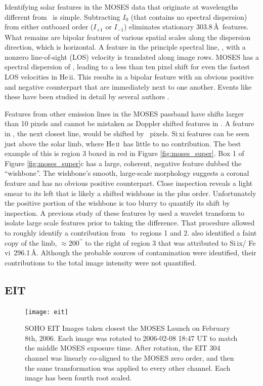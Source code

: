 		
		Identifying solar features in the MOSES data that originate at wavelengths different from \heii\ is simple. 
		Subtracting $I_0$ (that contains no spectral dispersion) from either outboard order ($I_{+1}$ or $I_{-1}$) eliminates stationary 303.8\,\AA\ features. 
		What remains are bipolar features of various spatial scales along the dispersion direction, which is horizontal.  
		A feature in the principle spectral line, \heii, with a nonzero line-of-sight (LOS) velocity is translated along image rows.    
		MOSES has a spectral dispersion of \spectdispersvel, leading to a less than ten pixel shift for even the fastest LOS velocities in He\,{\sc ii}. 
		This results in a bipolar feature with an obvious positive and negative counterpart that are immediately next to one another. Events like these have been studied in detail by several authors \citep{Fox2011,Courrier2018,Rust2019}.
		
		Features from other emission lines in the MOSES passband have shifts larger than 10 pixels and cannot be mistaken as Doppler shifted features in \heii. 
		A feature in \sixi, the next closest line, would be shifted by \sixipix\ pixels. 
		Si\,{\sc xi} features can be seen just above the solar limb, where He\,\textsc{ii}\ has little to no contribution. 
		The best example of this is region 3 boxed in red in Figure \ref{fig:moses_super}.  
		Box 1 of Figure \ref{fig:moses_super}c has a large, coherent, negative feature dubbed the ``wishbone''.  
		The wishbone's smooth, large-scale morphology suggests a coronal feature and has no obvious positive counterpart.  
		Close inspection reveals a light smear to its left that is likely a shifted wishbone in the plus order.  
		Unfortunately the positive portion of the wishbone is too blurry to quantify its shift by inspection. 
		A previous study of these features by \citet{Rust2017} used a wavelet transform to isolate large scale features prior to taking the difference.  
		That procedure allowed \citet{Rust2017} to roughly identify a contribution from \ to regions 1 and 2.
		\citet{Rust2017} also identified a faint copy of the limb, $\approx$200$^{\prime\prime}$ to the right of region 3 that was attributed to Si\,{\sc ix}/ Fe\,{\sc vi}\ 296.1\,\AA.
		Although the probable sources of contamination were identified, their contributions to the total image intensity were not quantified.
	
	\subsection{EIT}\label{sec:EIT_data}
		\begin{figure}
			\centering
			\texttt{[image: eit]}
			\caption{SOHO EIT Images taken closest the MOSES Launch on February 8th, 2006. Each image was rotated to 2006-02-08 18:47 UT to match the middle MOSES exposure time.  After rotation, the EIT 304 channel was linearly co-aligned to the MOSES zero order, and then the same transformation was applied to every other channel.  Each image has been fourth root scaled.}
			\label{fig:EIT}
		\end{figure}
	
